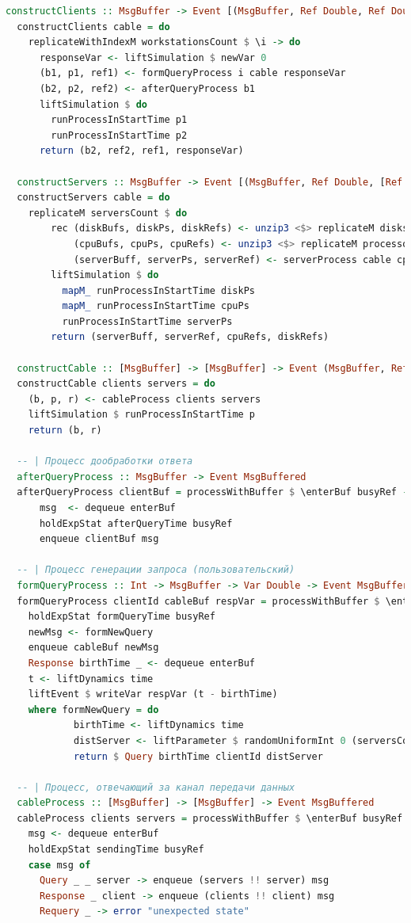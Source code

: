 \documentclass[russian,utf8,emptystyle]{eskdtext}
\begin{document}
\begin{lstlisting}[language=Haskell]
  constructClients :: MsgBuffer -> Event [(MsgBuffer, Ref Double, Ref Double, Var Double)]
  constructClients cable = do
    replicateWithIndexM workstationsCount $ \i -> do
      responseVar <- liftSimulation $ newVar 0 
      (b1, p1, ref1) <- formQueryProcess i cable responseVar
      (b2, p2, ref2) <- afterQueryProcess b1
      liftSimulation $ do 
        runProcessInStartTime p1
        runProcessInStartTime p2
      return (b2, ref2, ref1, responseVar)
  
  constructServers :: MsgBuffer -> Event [(MsgBuffer, Ref Double, [Ref Double], [Ref Double])]
  constructServers cable = do
    replicateM serversCount $ do
        rec (diskBufs, diskPs, diskRefs) <- unzip3 <$> replicateM disksCount (diskProcess serverBuff)
            (cpuBufs, cpuPs, cpuRefs) <- unzip3 <$> replicateM processorsCount (cpuProcess diskBufs)
            (serverBuff, serverPs, serverRef) <- serverProcess cable cpuBufs
        liftSimulation $ do
          mapM_ runProcessInStartTime diskPs
          mapM_ runProcessInStartTime cpuPs
          runProcessInStartTime serverPs 
        return (serverBuff, serverRef, cpuRefs, diskRefs)
  
  constructCable :: [MsgBuffer] -> [MsgBuffer] -> Event (MsgBuffer, Ref Double)
  constructCable clients servers = do
    (b, p, r) <- cableProcess clients servers
    liftSimulation $ runProcessInStartTime p
    return (b, r)
          
  -- | Процесс дообработки ответа
  afterQueryProcess :: MsgBuffer -> Event MsgBuffered
  afterQueryProcess clientBuf = processWithBuffer $ \enterBuf busyRef -> do
      msg  <- dequeue enterBuf
      holdExpStat afterQueryTime busyRef
      enqueue clientBuf msg
      
  -- | Процесс генерации запроса (пользовательский)
  formQueryProcess :: Int -> MsgBuffer -> Var Double -> Event MsgBuffered
  formQueryProcess clientId cableBuf respVar = processWithBuffer $ \enterBuf busyRef-> do
    holdExpStat formQueryTime busyRef
    newMsg <- formNewQuery
    enqueue cableBuf newMsg
    Response birthTime _ <- dequeue enterBuf
    t <- liftDynamics time
    liftEvent $ writeVar respVar (t - birthTime)
    where formNewQuery = do
            birthTime <- liftDynamics time
            distServer <- liftParameter $ randomUniformInt 0 (serversCount-1)
            return $ Query birthTime clientId distServer
  
  -- | Процесс, отвечающий за канал передачи данных
  cableProcess :: [MsgBuffer] -> [MsgBuffer] -> Event MsgBuffered
  cableProcess clients servers = processWithBuffer $ \enterBuf busyRef -> do
    msg <- dequeue enterBuf
    holdExpStat sendingTime busyRef
    case msg of
      Query _ _ server -> enqueue (servers !! server) msg
      Response _ client -> enqueue (clients !! client) msg
      Requery _ -> error "unexpected state"
       

\end{lstlisting}
\end{document}
